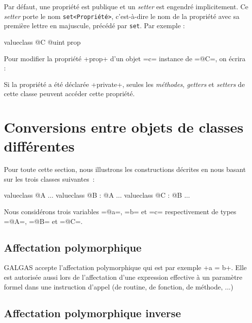 Par défaut, une propriété est publique et un \emph{setter} est engendré implicitement. Ce \emph{setter} porte le nom \texttt{set<Propriété>}, c'est-à-dire le nom de la propriété avec sa première lettre en majuscule, précédé par \texttt{set}. Par exemple :

\begin{galgas}
valueclass @C {
  @uint prop
}
\end{galgas}


Pour modifier la propriété \ggs+prop+ d'un objet \ggs=c= instance de \ggs=@C=, on écrira :

\begin{galgas}
[!?c setProp !12]
\end{galgas}

Si la propriété a été déclarée \ggs+private+, seules les \emph{méthodes}, \emph{getters} et \emph{setters} de cette classe peuvent accéder cette propriété.












\section{Conversions entre objets de classes différentes}

Pour toute cette section, nous illustrons les constructions décrites en nous basant sur les trois classes suivantes~:
\begin{galgas}
valueclass @A {
  ...
}
valueclass @B : @A {
  ...
}
valueclass @C : @B {
  ...
}
\end{galgas}

Nous considérons trois variables \ggs=@a=, \ggs=b= et \ggs=c= respectivement de types \ggs=@A=, \ggs=@B= et \ggs=@C=.


\subsection{Affectation polymorphique}

GALGAS accepte l'affectation polymorphique qui est par exemple \ggs+a = b+. Elle est autorisée aussi lors de l'affectation d'une expression effective à un paramètre formel dans une instruction d'appel (de routine, de fonction, de méthode, ...)


\subsection{Affectation polymorphique inverse}

